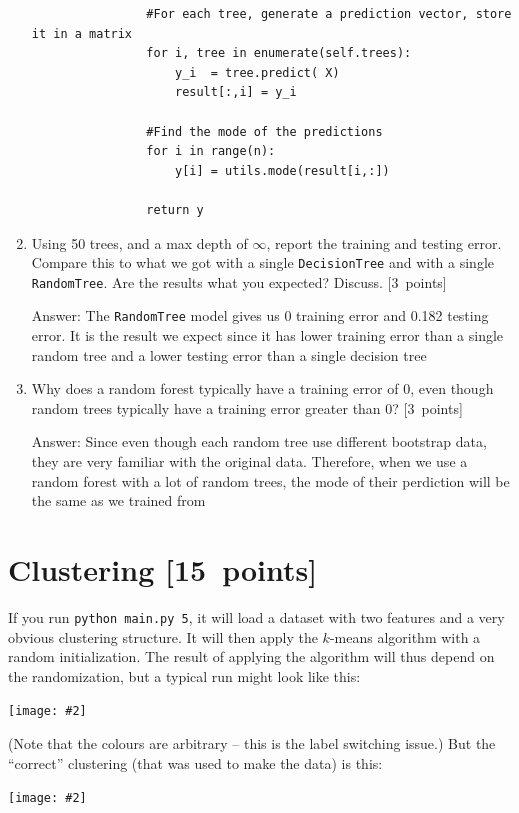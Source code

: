 \documentclass{article}
\newcommand{\blu}[1]{{\textcolor{blu}{#1}}}
\newenvironment{answer}{\par\begingroup\color{gre}Answer: }{\endgroup}
\let\ask\blu
\newcommand\pts[1]{\textcolor{pointscolour}{[#1~points]}}
\newcommand{\centerfig}[2]{\begin{center}\texttt{[image: \#2]}\end{center}}
\begin{document}
\begin{enumerate}
\begin{verbatim}
                #For each tree, generate a prediction vector, store it in a matrix
                for i, tree in enumerate(self.trees):
                    y_i  = tree.predict( X)
                    result[:,i] = y_i

                #Find the mode of the predictions
                for i in range(n):
                    y[i] = utils.mode(result[i,:])

                return y
        \end{verbatim}
        \item Using 50 trees, and a max depth of $\infty$, \ask{report the training and testing error}. Compare this to what we got with a single \texttt{DecisionTree} and with a single \texttt{RandomTree}. \ask{Are the results what you expected? Discuss.} \pts{3}
        \begin{answer}
            The \texttt{RandomTree} model gives us 0 training error and 0.182 testing error. It is the result we expect since it has lower training error than a single random tree and a lower testing error than a single decision tree
        \end{answer}
        \item \ask{Why does a random forest typically have a training error of 0, even though random trees typically have a training error greater than 0?} \pts{3}
        \begin{answer}
            Since even though each random tree use different bootstrap data, they are very familiar with the original data. Therefore, when we use a random forest with a lot of random trees, the mode of their perdiction will be the same as we trained from 
        \end{answer}
    \end{enumerate}


    \clearpage
    \section{Clustering \pts{15}}

    If you run \verb|python main.py 5|, it will load a dataset with two features
    and a very obvious clustering structure. It will then apply the $k$-means algorithm
    with a random initialization. The result of applying the
    algorithm will thus depend on the randomization, but a typical run might look like this:
    \centerfig{.5}{figs/kmeans_basic.png}
    (Note that the colours are arbitrary -- this is the label switching issue.)
    But the ``correct'' clustering (that was used to make the data) is this:
    \centerfig{.5}{figs/kmeans_good.png}
\end{document}

